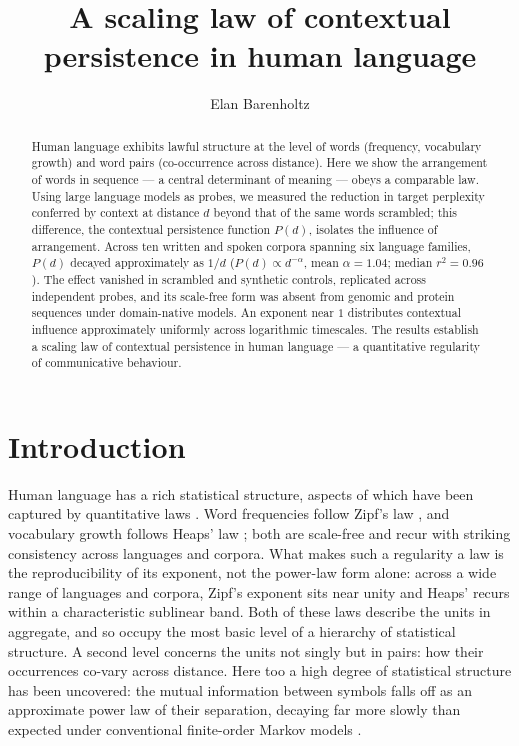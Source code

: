 \documentclass[11pt]{article}
\title{\bfseries A scaling law of contextual persistence in human language}
\author[1]{Elan Barenholtz}
\affil[1]{Machine Perception and Cognitive Robotics Laboratory, Department of Psychology and
Center for Complex Systems, Florida Atlantic University}
\date{}
\begin{document}
\linenumbers
\maketitle

\begin{abstract}
\noindent
Human language exhibits lawful structure at the level of words (frequency,
vocabulary growth) and word pairs (co-occurrence across distance). Here we show the arrangement of words in
sequence --- a central determinant of meaning --- obeys a comparable law. Using
large language models as probes, we measured the reduction in target perplexity
conferred by context at distance $d$ beyond that of the same words scrambled;
this difference, the contextual persistence function $P(d)$, isolates the influence of
arrangement. Across ten written and spoken corpora spanning six
language families, $P(d)$ decayed approximately as $1/d$
($P(d)\propto d^{-\alpha}$, mean $\alpha=1.04$; median $r^2=0.96$). The effect vanished
in scrambled and synthetic controls, replicated across independent probes, and its scale-free
form was absent from genomic and protein sequences under domain-native models. An exponent near $1$ distributes
contextual influence approximately uniformly across logarithmic timescales. The results
establish a scaling law of contextual persistence in human language --- a quantitative
regularity of communicative behaviour.
\end{abstract}

\section{Introduction}

Human language has a rich statistical structure, aspects of which have been captured by quantitative
laws \citep{altmann2016statistical, tanakaishii2021statistical}. Word frequencies follow Zipf's law \citep{zipf1949human}, and
vocabulary growth follows Heaps' law \citep{heaps1978information}; both are scale-free and recur
with striking consistency across languages and corpora. What makes such a regularity a law is the
reproducibility of its exponent, not the power-law form alone: across a wide range of languages and
corpora, Zipf's exponent sits near unity and Heaps' recurs within a characteristic sublinear band.
Both of these laws describe the units in aggregate, and so occupy
the most basic level of a hierarchy of statistical structure. A second level concerns
the units not singly but in pairs: how their occurrences co-vary across distance. Here too a high
degree of statistical structure has been uncovered: the mutual information
between symbols falls off as an approximate power law of their separation, decaying far more slowly
than expected under conventional finite-order Markov models \citep{ebeling1994entropy, lin2017critical, montemurro2002longrange}.
\end{document}
